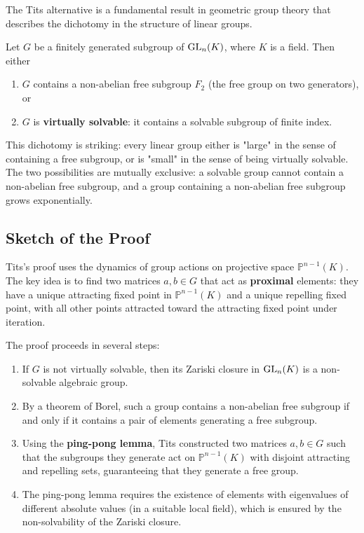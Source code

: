 The Tits alternative is a fundamental result in geometric group theory that describes the dichotomy in the structure of linear groups.

\begin{theorem}
Let \(G\) be a finitely generated subgroup of \(\operatorname{GL}_n(K)\), where \(K\) is a field. Then either
\begin{enumerate}
    \item \(G\) contains a non-abelian free subgroup \(F_2\) (the free group on two generators), or
    \item \(G\) is \textbf{virtually solvable}: it contains a solvable subgroup of finite index.
\end{enumerate}
\end{theorem}

This dichotomy is striking: every linear group either is "large" in the sense of containing a free subgroup, or is "small" in the sense of being virtually solvable. The two possibilities are mutually exclusive: a solvable group cannot contain a non-abelian free subgroup, and a group containing a non-abelian free subgroup grows exponentially.

\subsection{Sketch of the Proof}

Tits's proof uses the dynamics of group actions on projective space \(\mathbb{P}^{n-1}(K)\). The key idea is to find two matrices \(a, b \in G\) that act as \textbf{proximal} elements: they have a unique attracting fixed point in \(\mathbb{P}^{n-1}(K)\) and a unique repelling fixed point, with all other points attracted toward the attracting fixed point under iteration.

The proof proceeds in several steps:
\begin{enumerate}
    \item If \(G\) is not virtually solvable, then its Zariski closure in \(\operatorname{GL}_n(K)\) is a non-solvable algebraic group.
    \item By a theorem of Borel, such a group contains a non-abelian free subgroup if and only if it contains a pair of elements generating a free subgroup.
    \item Using the \textbf{ping-pong lemma}, Tits constructed two matrices \(a, b \in G\) such that the subgroups they generate act on \(\mathbb{P}^{n-1}(K)\) with disjoint attracting and repelling sets, guaranteeing that they generate a free group.
    \item The ping-pong lemma requires the existence of elements with eigenvalues of different absolute values (in a suitable local field), which is ensured by the non-solvability of the Zariski closure.
\end{enumerate}

